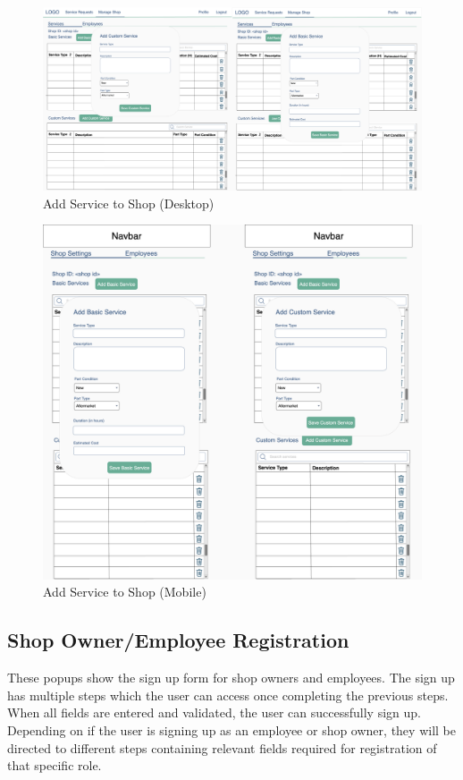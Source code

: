 \documentclass[12pt, titlepage]{article}
\begin{document}
\begin{figure}[H]
	\centering
	\includegraphics[width=\textwidth]{mockups/Service Form (Shop Settings) (Desktop).png}
	\caption{Add Service to Shop (Desktop)}
\end{figure}

\begin{figure}[H]
	\centering
	\includegraphics[width=\textwidth]{mockups/Service Form (Shop Settings) (Mobile).png}
	\caption{Add Service to Shop (Mobile)}
\end{figure}

\subsection{Shop Owner/Employee Registration}
These popups show the sign up form for shop owners and employees. The sign up has multiple steps
which the user can access once completing the previous steps. When all fields are entered and
validated, the user can successfully sign up. Depending on if the user is signing up as an employee or shop owner, they will be directed to different steps containing relevant fields required for registration of that specific role.
\end{document}
